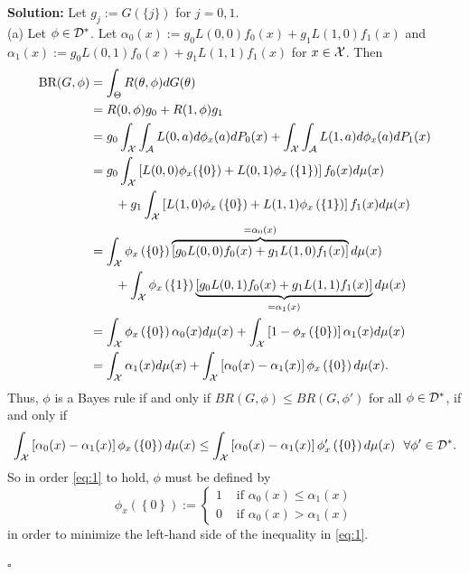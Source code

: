 \documentclass[12pt]{article}
\newcounter{ProofCounter}
\newenvironment{Solution}{\stepcounter{ProofCounter}\textbf{Solution:}}{\hfill$\square$}
\begin{document}
\begin{Solution}
  Let $g_j := G(\{j\})$ for $j = 0,1$. \\

  (a) Let $\phi \in \mathcal{D}^*$. Let $\alpha_0(x) := g_0L(0,0)f_0(x) + g_1L(1,0)f_1(x)$ and $\alpha_1(x) := g_0L(0,1)f_0(x) + g_1L(1,1)f_1(x)$
  for $x \in \mathcal{X}$.
  Then 
  \begin{align*}
    \text{BR}(G,\phi) & = \int_{\Theta}R(\theta, \phi)dG(\theta) \\
    & = R(0,\phi) g_0 + R(1,\phi)g_1 \\
    & = g_0 \int_{\mathcal{X}}\int_{\mathcal{A}}L(0,a)d\phi_x(a)dP_0(x) + \int_{\mathcal{X}}\int_{\mathcal{A}}L(1,a)d\phi_x(a)dP_1(x) \\
    & = g_0 \int_{\mathcal{X}}\left[ L(0,0)\phi_x(\left\{ 0 \right\}) + L(0,1)\phi_x\left( \left\{ 1 \right\} \right) \right]f_0(x)d\mu(x) \\
    & \qquad + 
    g_1\int_{\mathcal{X}}\left[ L(1,0)\phi_x\left( \left\{ 0 \right\} \right) + L(1,1)\phi_x\left( \left\{ 1 \right\} \right) \right]f_1(x)d\mu(x) \\
    & = \int_{\mathcal{X}}\phi_x\left( \left\{ 0 \right\} \right)\overbrace{\left[ g_0L(0,0)f_0(x) + g_1L(1,0)f_1(x) \right]}^{= \alpha_0(x)}d\mu(x) \\
    & \qquad + \int_{\mathcal{X}}\phi_x\left( \left\{ 1 \right\} \right)\underbrace{\left[ g_0L(0,1)f_0(x) + g_1L(1,1)f_1(x) \right]}_{=\alpha_1(x)}d\mu(x) \\
    & = \int_{\mathcal{X}}\phi_x\left( \left\{ 0 \right\} \right)\alpha_0(x)d\mu(x) + \int_{\mathcal{X}}\left[ 1 - \phi_x\left( \left\{ 0 \right\} \right)
    \right]\alpha_1(x)d\mu(x) \\
    & = \int_{\mathcal{X}}\alpha_1(x)d\mu(x) + \int_{\mathcal{X}}\left[ \alpha_0(x) - \alpha_1(x) \right]\phi_x\left( \left\{ 0 \right\} \right)d\mu(x).
  \end{align*}
  Thus, $\phi$ is a Bayes rule if and only if $BR(G,\phi) \leq BR(G,\phi')$ for all $\phi \in \mathcal{D}^*$, if and only if 
  \begin{equation}
    \int_{\mathcal{X}}\left[ \alpha_0(x) - \alpha_1(x) \right]\phi_x\left( \left\{ 0 \right\} \right)d\mu(x) \leq \int_{\mathcal{X}}\left[ \alpha_0(x) - \alpha_1(x)
    \right]\phi_x'\left( \left\{ 0 \right\} \right)d\mu(x) \ \ \forall \phi' \in \mathcal{D}^*.
    \label{eq:1}
  \end{equation}
  So in order \eqref{eq:1} to hold, $\phi$ must be defined by 
  \[
    \phi_x\left( \left\{ 0 \right\} \right) := \left\{ \begin{array}{cl}
        1 & \text{ if } \alpha_0(x) \leq \alpha_1(x) \\
        0 & \text{ if } \alpha_0(x) > \alpha_1(x) 
    \end{array} \right. 
  \]
  in order to minimize the left-hand side of the inequality in \eqref{eq:1}.


\end{Solution}
\end{document}
